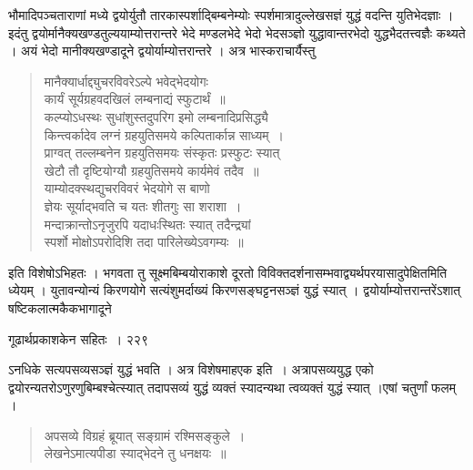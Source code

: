 \documentclass[11pt, openany]{book}
\begin{document}
भौमादिपञ्चताराणां मध्ये द्वयोर्युतौ तारकास्पर्शाद्बिम्बनेम्योः स्पर्शमात्रादुल्लेखसज्ञं युद्धं वदन्ति युतिभेदज्ञाः । इदंतु द्वयोर्मानैक्यखण्डतुल्ययाम्योत्तरान्तरे भेदे मण्डलभेदे भेदो भेदसञ्ज्ञो युद्धावान्तरभेदो युद्धभैदतत्त्वज्ञैः कथ्यते । अयं भेदो मानीक्यखण्डादूने द्वयोर्याम्योत्तरान्तरे । अत्र भास्कराचार्यैस्तु\textendash


\begin{quote}
{\qt मानैक्यार्धाद्द्युचरविवरेऽल्पे भवेद्भेदयोगः \\
कार्यं सूर्यग्रहवदखिलं लम्बनाद्यं स्फुटार्थं~॥\\

कल्प्योऽधस्थः सुधांशुस्तदुपरिग इमो लम्बनादिप्रसिद्ध्यै \\
किन्त्वर्कादेव लग्नं ग्रहयुतिसमये कल्पितार्कान्न साध्यम्~।\\
प्राग्वत् तल्लम्बनेन ग्रहयुतिसमयः संस्कृतः प्रस्फुटः स्यात् \\
खेटौ तौ दृष्टियोग्यौ ग्रहयुतिसमये कार्यमेवं तदैव~॥\\

याम्योदक्स्थद्युचरविवरं भेदयोगे स बाणो \\
ज्ञेयः सूर्याद्भवति च यतः शीतगुः सा शराशा~। \\
मन्दाक्रान्तोऽनृजुरपि यदाधःस्थितः स्यात् तदैन्द्र्यां \\
स्पर्शो मोक्षोऽपरोदिशि तदा पारिलेख्येऽवगम्यः~॥\\}
\end{quote}


इति विशेषोऽभिहतः । भगवता तु सूक्ष्मबिम्बयोराकाशे दूरतो विविक्तदर्शनासम्भवाद्व्यर्थपरयासादुपेक्षितमिति ध्येयम् । युतावन्योन्यं किरणयोगे सत्यंशुमर्दाख्यं किरणसङ्घट्टनसञ्ज्ञं युद्धं स्यात् । द्वयोर्याम्योत्तरान्तरेंऽशात् षष्टिकलात्मकैकभागादूने \textendash


\newpage

\hspace{4cm} गूढार्थप्रकाशकेन सहितः~। \hfill २२९
\vspace{1cm}


\noindent ऽनधिके सत्यपसव्यसञ्ज्ञं युद्धं भवति । अत्र विशेषमाह\textendash एक इति~। अत्रापसव्ययुद्ध एको द्वयोरन्यतरोऽणुरणुबिम्बश्चेत्स्यात् तदापसव्यं युद्धं व्यक्तं स्यादन्यथा त्वव्यक्तं युद्धं स्यात् ।एषां चतुर्णां फलम् ।


\begin{quote}
{\qt अपसव्ये विग्रहं ब्रूयात् सङ्ग्रामं रश्मिसङ्कुले~। \\
लेखनेऽमात्यपीडा स्याद्भेदने तु धनक्षयः~॥ \\ }
\end{quote}
\end{document}
